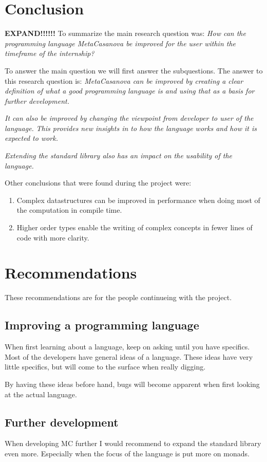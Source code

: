 \chapter{Conclusion}
\textbf{EXPAND!!!!!!}
To summarize the main research question was:
\emph{How can the programming language MetaCasanova be improved for the user within the timeframe of the internship?}

To answer the main question we will first answer the subquestions.
The answer to this research question is:
\emph{MetaCasanova can be improved by creating a clear definition of what a good programming language is and using that as a basis for further development.}

\emph{It can also be improved by changing the viewpoint from developer to user of the language.}
\emph{This provides new insights in to how the language works and how it is expected to work.}

\emph{Extending the standard library also has an impact on the usability of the language.}

Other conclusions that were found during the project were:
\begin{enumerate}
\item Complex datastructures can be improved in performance when doing most of the computation in compile time.
\item Higher order types enable the writing of complex concepts in fewer lines of code with more clarity.
\end{enumerate}



\chapter{Recommendations}
These recommendations are for the people continueing with the project.

\section{Improving a programming language}
When first learning about a language, keep on asking until you have specifics.
Most of the developers have general ideas of a language.
These ideas have very little specifics, but will come to the surface when really digging.

By having these ideas before hand, bugs will become apparent when first looking at the actual language.


\section{Further development}
When developing MC further I would recommend to expand the standard library even more.
Especially when the focus of the language is put more on monads.


